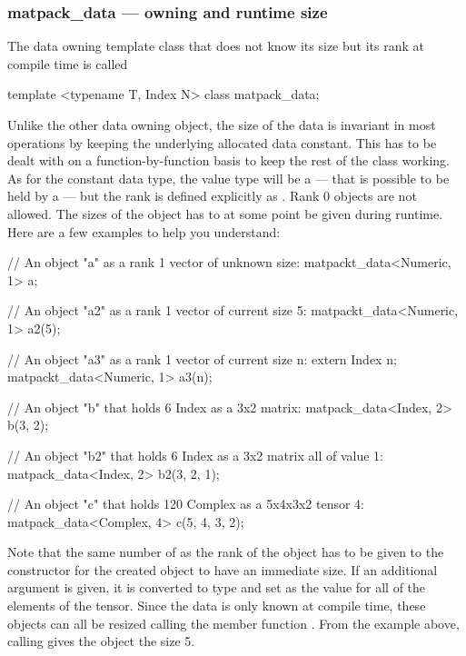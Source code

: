 \subsubsection{matpack\_data --- owning and runtime size}
The data owning template class that does not know its size but its rank at compile time is called
\begin{code}
template <typename T, Index N> class matpack_data;
\end{code}
Unlike the other data owning object, the size of the data is invariant in most operations by
keeping the underlying allocated data constant.  This has to be dealt with on a function-by-function
basis to keep the rest of the class working.
As for the constant data type, the value type will be a  --- that is possible to be held by a  ---
but the rank is defined explicitly as .  Rank 0 objects are not allowed.
The sizes of the object has to at some point be given during runtime. Here are a few examples to help you understand:
\begin{code}
// An object "a" as a rank 1 vector of unknown size:
matpackt_data<Numeric, 1> a;

// An object "a2" as a rank 1 vector of current size 5:
matpackt_data<Numeric, 1> a2(5);

// An object "a3" as a rank 1 vector of current size n:
extern Index n;
matpackt_data<Numeric, 1> a3(n);

// An object "b" that holds 6 Index as a 3x2 matrix:
matpack_data<Index, 2> b(3, 2);

// An object "b2" that holds 6 Index as a 3x2 matrix all of value 1:
matpack_data<Index, 2> b2(3, 2, 1);

// An object "c" that holds 120 Complex as a 5x4x3x2 tensor 4:
matpack_data<Complex, 4> c(5, 4, 3, 2);
\end{code}
Note that the same number of  as the rank of the object has to
be given to the constructor for the created object to have an immediate size.
If an additional argument is given, it is converted to type  and
set as the value for all of the elements of the tensor.
Since the data is only known at compile time, these objects can all be resized
calling the member function .  From the example above, calling
 gives the object the size 5.

